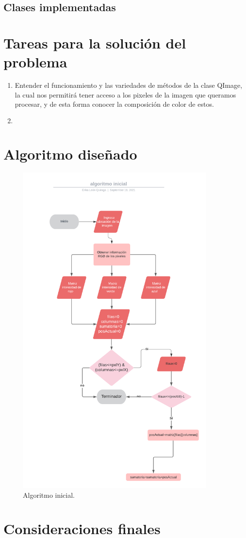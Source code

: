 \documentclass{article}
\begin{document}
\subsection{Clases implementadas}


\section{Tareas para la solución del problema} \label{tareas}
\begin{enumerate}
\item Entender el funcionamiento y las variedades de métodos de la clase QImage, la cual nos permitirá tener acceso a los pixeles de la imagen que queramos procesar, y de esta forma conocer la composición de color de estos.
\item 


\end{enumerate}

\section{Algoritmo diseñado} \label{algorimo}

\begin{figure}[h]
\includegraphics[width=10cm]{algoritmo.png}
\centering
\caption{Algoritmo inicial.}
\label{fig:algoritmo}
\end{figure}

\section{Consideraciones finales} \label{consideracionesfinales}
\end{document}
